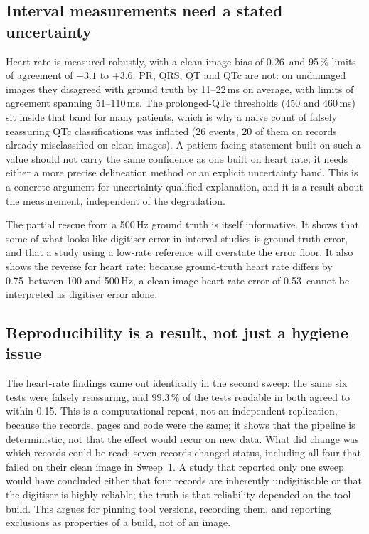 \subsection{Interval measurements need a stated uncertainty}
Heart rate is measured robustly, with a clean-image bias of 0.26\bpm\ and 95\,\% limits of agreement of $-3.1$ to $+3.6$\bpm. PR, QRS, QT and QTc are not: on undamaged images they disagreed with ground truth by 11--22\,ms on average, with limits of agreement spanning 51--110\,ms. The prolonged-QTc thresholds (450 and 460\,ms) sit inside that band for many patients, which is why a naive count of falsely reassuring QTc classifications was inflated (26 events, 20 of them on records already misclassified on clean images). A patient-facing statement built on such a value should not carry the same confidence as one built on heart rate; it needs either a more precise delineation method or an explicit uncertainty band. This is a concrete argument for uncertainty-qualified explanation, and it is a result about the measurement, independent of the degradation.

The partial rescue from a 500\,Hz ground truth is itself informative. It shows that some of what looks like digitiser error in interval studies is ground-truth error, and that a study using a low-rate reference will overstate the error floor. It also shows the reverse for heart rate: because ground-truth heart rate differs by 0.75\bpm\ between 100 and 500\,Hz, a clean-image heart-rate error of 0.53\bpm\ cannot be interpreted as digitiser error alone.

\subsection{Reproducibility is a result, not just a hygiene issue}
The heart-rate findings came out identically in the second sweep: the same six tests were falsely reassuring, and 99.3\,\% of the tests readable in both agreed to within 0.15\bpm. This is a computational repeat, not an independent replication, because the records, pages and code were the same; it shows that the pipeline is deterministic, not that the effect would recur on new data. What did change was which records could be read: seven records changed status, including all four that failed on their clean image in Sweep~1. A study that reported only one sweep would have concluded either that four records are inherently undigitisable or that the digitiser is highly reliable; the truth is that reliability depended on the tool build. This argues for pinning tool versions, recording them, and reporting exclusions as properties of a build, not of an image.


